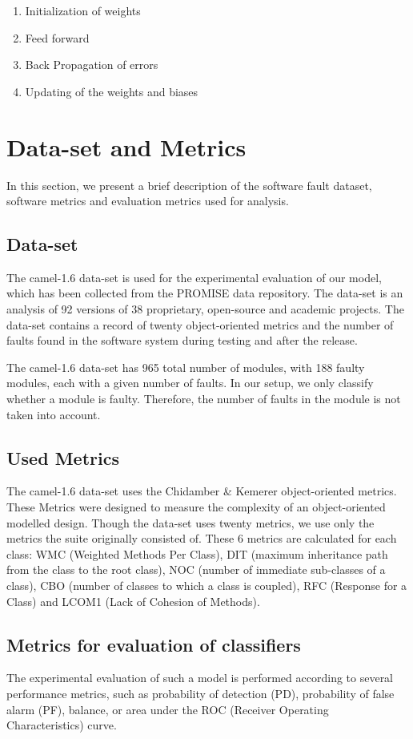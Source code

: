 \documentclass[10pt, conference, compsocconf]{IEEEtran}
\begin{document}
\begin{enumerate}
\item Initialization of weights
\item Feed forward
\item Back Propagation of errors
\item Updating of the weights and biases
\end{enumerate}

\section{Data-set and Metrics}
In this section, we present a brief description of the software fault dataset, software metrics and evaluation metrics used for analysis.

\subsection{Data-set}
The camel-1.6 data-set is used for the experimental evaluation of our model, which has been collected from the PROMISE data repository\cite{promisedataset}. The data-set is an analysis of 92 versions of 38 proprietary, open-source and academic projects. The data-set contains a record of twenty object-oriented metrics and the number of faults found in the software system during testing and after the release.

The camel-1.6 data-set has 965 total number of modules, with 188 faulty modules, each with a given number of faults. In our setup, we only classify whether a module is faulty. Therefore, the number of faults in the module is not taken into account.

\subsection{Used Metrics}
The camel-1.6 data-set uses the Chidamber \& Kemerer object-oriented metrics. These Metrics were designed to measure the complexity of an object-oriented modelled design. Though the data-set uses twenty metrics, we use only the metrics the suite originally consisted of. These 6 metrics are calculated for each class: WMC (Weighted Methods Per Class), DIT (maximum inheritance path from the class to the root class), NOC (number of immediate sub-classes of a class), CBO (number of classes to which a class is coupled), RFC (Response for a Class) and LCOM1 (Lack of Cohesion of Methods).

\subsection{Metrics for evaluation of classifiers}
The experimental evaluation of such a model is performed according to several performance metrics, such as probability of detection (PD), probability of false alarm (PF), balance, or area under the ROC (Receiver Operating Characteristics) curve.
\end{document}

